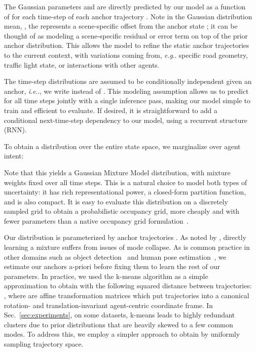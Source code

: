 \documentclass{article}
\makeatletter
\DeclareRobustCommand\onedot{\futurelet\@let@token\@onedot}
\def\@onedot{\ifx\@let@token.\else.\null\fi\xspace}
\def\eg{\emph{e.g}\onedot} \def\Eg{\emph{E.g}\onedot}
\def\ie{\emph{i.e}\onedot} \def\Ie{\emph{I.e}\onedot}
\makeatother
\begin{document}
The Gaussian parameters  and  are directly predicted by our model as a function of  for each time-step of each anchor trajectory .  Note in the Gaussian distribution mean, , the  represents a scene-specific offset from the anchor state ; it can be thought of as modeling a scene-specific residual or error term on top of the prior anchor distribution. This allows the model to refine the static anchor trajectories to the current context, with variations coming from, \eg specific road geometry, traffic light state, or interactions with other agents.

The time-step distributions are assumed to be conditionally independent given an anchor, \ie, we write  instead of . This modeling assumption allows us to predict for all time steps jointly with a single inference pass, making our model simple to train and efficient to evaluate. If desired, it is straightforward to add a conditional next-time-step dependency to our model, using a recurrent structure (RNN).

To obtain a distribution over the entire state space, we marginalize over agent intent:

Note that this yields a Gaussian Mixture Model distribution, with mixture weights fixed over all time steps. This is a natural choice to model both types of uncertainty: it has rich representational power, a closed-form partition function, and is also compact.  It is easy to evaluate this distribution on a discretely sampled grid to obtain a probabilistic occupancy grid, more cheaply and with fewer parameters than a native occupancy grid formulation~\cite{Hong19, Bansal19}. 

Our distribution is parameterized by anchor trajectories . As noted by \cite{Hong19, Bishop06}, directly learning a mixture suffers from issues of mode collapse. As is common practice in other domains such as object detection~\cite{Liu16} and human pose estimation~\cite{Yang12}, we estimate our anchors a-priori before fixing them to learn the rest of our parameters.
In practice, we used the k-means algorithm as a simple approximation to obtain  with the following squared distance between trajectories: , where  are affine transformation matrices which put trajectories into a canonical rotation- and translation-invariant agent-centric coordinate frame. In Sec.~\ref{sec:experiments}, on some datasets, k-means leads to highly redundant clusters due to prior distributions that are heavily skewed to a few common modes. To address this, we employ a simpler approach to obtain  by uniformly sampling trajectory space.
\end{document}
